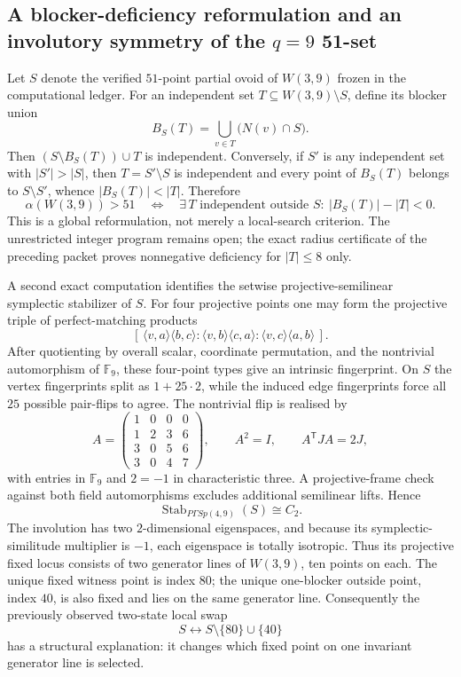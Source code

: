 \subsection{A blocker-deficiency reformulation and an involutory symmetry of the $q=9$ 51-set}
\label{sec:pass7130-7137-structural-attack}

Let $S$ denote the verified $51$-point partial ovoid of $W(3,9)$ frozen in the computational ledger.  For an independent set $T\subseteq W(3,9)\setminus S$, define its blocker union
\[
 B_S(T)=\bigcup_{v\in T}\bigl(N(v)\cap S\bigr).
\]
Then $(S\setminus B_S(T))\cup T$ is independent.  Conversely, if $S'$ is any independent set with $|S'|>|S|$, then $T=S'\setminus S$ is independent and every point of $B_S(T)$ belongs to $S\setminus S'$, whence $|B_S(T)|<|T|$.  Therefore
\begin{equation}
 \alpha(W(3,9))>51
 \quad\Longleftrightarrow\quad
 \exists\,T\text{ independent outside }S:\ |B_S(T)|-|T|<0.
 \label{eq:blocker-deficiency-global}
\end{equation}
This is a global reformulation, not merely a local-search criterion.  The unrestricted integer program remains open; the exact radius certificate of the preceding packet proves nonnegative deficiency for $|T|\leq 8$ only.

A second exact computation identifies the setwise projective-semilinear symplectic stabilizer of $S$.  For four projective points one may form the projective triple of perfect-matching products
\[
 [\,\langle v,a\rangle\langle b,c\rangle:
    \langle v,b\rangle\langle c,a\rangle:
    \langle v,c\rangle\langle a,b\rangle\,].
\]
After quotienting by overall scalar, coordinate permutation, and the nontrivial automorphism of $\mathbb F_9$, these four-point types give an intrinsic fingerprint.  On $S$ the vertex fingerprints split as $1+25\cdot2$, while the induced edge fingerprints force all $25$ possible pair-flips to agree.  The nontrivial flip is realised by
\[
 A=\begin{pmatrix}
 1&0&0&0\\
 1&2&3&6\\
 3&0&5&6\\
 3&0&4&7
 \end{pmatrix},
 \qquad A^2=I,\qquad A^{\mathsf T}JA=2J,
\]
with entries in $\mathbb F_9$ and $2=-1$ in characteristic three.  A projective-frame check against both field automorphisms excludes additional semilinear lifts.  Hence
\[
 \operatorname{Stab}_{P\Gamma Sp(4,9)}(S)\cong C_2.
\]
The involution has two $2$-dimensional eigenspaces, and because its symplectic-similitude multiplier is $-1$, each eigenspace is totally isotropic.  Thus its projective fixed locus consists of two generator lines of $W(3,9)$, ten points on each.  The unique fixed witness point is index $80$; the unique one-blocker outside point, index $40$, is also fixed and lies on the same generator line.  Consequently the previously observed two-state local swap
\[
 S\longleftrightarrow S\setminus\{80\}\cup\{40\}
\]
has a structural explanation: it changes which fixed point on one invariant generator line is selected.

